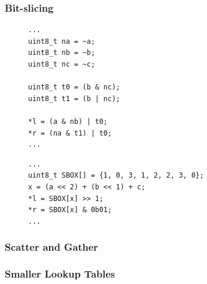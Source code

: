 \subsubsection{Bit-slicing}

\begin{figure}[h!]
    \centering
\begin{lstlisting}[xleftmargin=.02\textwidth,xrightmargin=.01\textwidth]
...
uint8_t na = ~a;
uint8_t nb = ~b;
uint8_t nc = ~c;

uint8_t t0 = (b & nc);
uint8_t t1 = (b | nc);

*l = (a & nb) | t0;
*r = (na & t1) | t0;
...
\end{lstlisting}
\caption{}
\label{SBOX_bitslicing}
\end{figure}

\begin{figure}[h!]
    \centering
\begin{lstlisting}[xleftmargin=.02\textwidth,xrightmargin=.01\textwidth]
...
uint8_t SBOX[] = {1, 0, 3, 1, 2, 2, 3, 0};
x = (a << 2) + (b << 1) + c;
*l = SBOX[x] >> 1;
*r = SBOX[x] & 0b01;
...
\end{lstlisting}
\caption{}
\label{SBOX_da}
\end{figure}

\subsubsection{Scatter and Gather}
\subsubsection{Smaller Lookup Tables}
